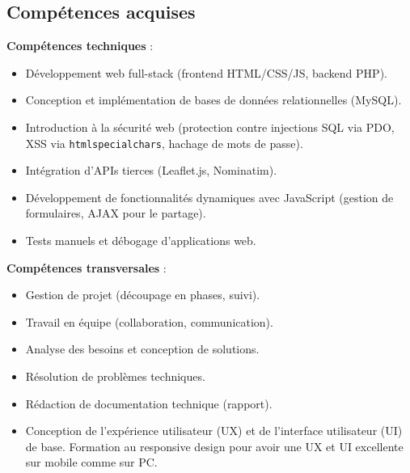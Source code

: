 \documentclass[a4paper,12pt]{article}
\begin{document}
\subsection{Compétences acquises}
\textbf{Compétences techniques} :
\begin{itemize}
  \item Développement web full-stack (frontend HTML/CSS/JS, backend PHP).
  \item Conception et implémentation de bases de données relationnelles (MySQL).
  \item Introduction à la sécurité web (protection contre injections SQL via PDO, XSS via \texttt{htmlspecialchars}, hachage de mots de passe).
  \item Intégration d’APIs tierces (Leaflet.js, Nominatim).
  \item Développement de fonctionnalités dynamiques avec JavaScript (gestion de formulaires, AJAX pour le partage).
  \item Tests manuels et débogage d'applications web.
\end{itemize}

\textbf{Compétences transversales} :
\begin{itemize}
  \item Gestion de projet (découpage en phases, suivi).
  \item Travail en équipe (collaboration, communication).
  \item Analyse des besoins et conception de solutions.
  \item Résolution de problèmes techniques.
  \item Rédaction de documentation technique (rapport).
  \item Conception de l'expérience utilisateur (UX) et de l'interface utilisateur (UI) de base. Formation au responsive design pour avoir une UX et UI excellente sur mobile comme sur PC.
\end{itemize}
\end{document}
